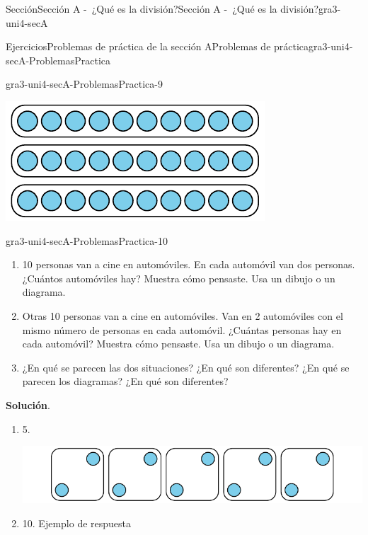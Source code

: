 \documentclass[oneside,10pt,]{article}
\newcommand{\blocktitlefont}{\relax}
\begin{document}
\begin{sectionptx}{Sección}{Sección A -~¿Qué es la división?}{}{Sección A -~¿Qué es la división?}{}{}{gra3-uni4-secA}
\begin{exercises-subsection}{Ejercicios}{Problemas de práctica de la sección A}{}{Problemas de práctica}{}{}{gra3-uni4-secA-ProblemasPractica}
\begin{divisionexercise}{7}{}{}{gra3-uni4-secA-ProblemasPractica-9}
\begin{enumerate}[label={(\alph*)}]
\begin{image}{0}{1}{0}{}
\includegraphics[width=\linewidth]{external/svg-source/tikz-file-152433.pdf}
\end{image}%
\end{enumerate}
\end{divisionexercise}%
\begin{divisionexercise}{8}{}{}{gra3-uni4-secA-ProblemasPractica-10}%
%
\begin{enumerate}[label={(\alph*)}]
\item{}10 personas van a cine en automóviles. En cada automóvil van dos personas. ¿Cuántos automóviles hay? Muestra cómo pensaste. Usa un dibujo o un diagrama.%
\item{}Otras 10 personas van a cine en automóviles. Van en 2 automóviles con el mismo número de personas en cada automóvil. ¿Cuántas personas hay en cada automóvil? Muestra cómo pensaste. Usa un dibujo o un diagrama.%
\item{}¿En qué se parecen las dos situaciones? ¿En qué son diferentes? ¿En qué se parecen los diagramas? ¿En qué son diferentes?%
\end{enumerate}
%
\par\smallskip%
\noindent\textbf{\blocktitlefont Solución}.\hypertarget{gra3-uni4-secA-ProblemasPractica-10-2}{}\quad{}%
\begin{enumerate}[label={(\alph*)}]
\item{}5.%
\begin{image}{0}{1}{0}{}%
\includegraphics[width=\linewidth]{external/svg-source/tikz-file-152434.pdf}
\end{image}%
\item{}10. Ejemplo de respuesta%
\begin{image}{0}{1}{0}{}%

\end{image}
\end{enumerate}
\end{divisionexercise}
\end{exercises-subsection}
\end{sectionptx}
\end{document}
